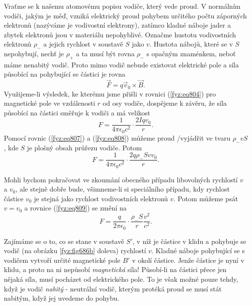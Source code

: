     Vraťme se k našemu atomovému popisu vodiče, který vede proud. V normálním vodiči, jakým je měď,
    vzniká elektrický proud pohybem určitého počtu záporných elektronů (nazýváme je vodivostní
    elektrony), zatímco kladné náboje jader a zbytek elektronů jsou v materiálu nepohyblivé. Označme
    hustotu vodivostních elektronů \( ρ_−\) a jejich rychlost v soustavě \(S\) jako \(v\). Hustota
    nábojů, které se v \(S\) nepohybují, nechť je \( ρ_+\) a ta musí být rovna \( ρ_−\) s opačným
    znaménkem, neboť  máme nenabitý vodič. Proto mimo vodič nebude existovat elektrické pole a síla
    působící na pohybující se částici je rovna
    \begin{equation*}
      \vec{F}=q\vec{v}_0\times\vec{B}.
    \end{equation*}
    Využijeme-li výsledek, ke kterému jsme přišli v rovnici (\ref{fyz:eq804}) pro magnetické pole ve
    vzdálenosti \(r\) od osy vodiče, dospějeme k závěru, že síla působící na částici směřuje k
    vodiči a má velikost
    \begin{equation*}
      F=\dfrac{1}{4πϵ_0c^2}\cdot\dfrac{2Iqv_0}{r}.
    \end{equation*}
    Pomocí rovnic (\ref{fyz:eq807}) a (\ref{fyz:eq808}) můžeme proud /vyjádřit ve tvaru
    \(ρ_−vS\), kde \(S\) je plošný obsah průřezu vodiče. Potom
    \begin{equation}\label{fyz:eq809}
      F=\dfrac{1}{4πϵ_0c^2}\cdot\dfrac{2qρ_−Svv_0}{r}.
    \end{equation}

    Mohli bychom pokračovat ve zkoumání obecného případu libovolných rychlostí \(v\) a \(v_0\), ale
    stejně dobře bude, všimneme-li si speciálního případu, kdy rychlost částice \(v_0\) je stejná
    jako rychlost vodivostních elektronů \(v\). Potom můžeme psát \(v=v_0\) a rovnice
    (\ref{fyz:eq809}) se změní na
    \begin{equation}\label{fyz:eq810}
      F=\dfrac{q}{2πϵ_0}\cdot\dfrac{ρ_−S}{r}\dfrac{v^2}{c^2}.
    \end{equation}

    Zajímáme se o to, co se stane v soustavě \(S'\), v níž je částice v klidu a pohybuje se vodič
    (na  obrázku \ref{fyz:fig686b} doleva) rychlostí \(v\). Kladné náboje pohybující se s vodičem
    vytvoří určité magnetické pole  \(B'\) v okolí částice. Jenže částice je nyní v klidu, a proto
    na ni nepůsobí \emph{magnetická} síla! Působí-li na částici přece jen nějaká síla, musí pocházet
    od elektrického pole. To je však možné pouze tehdy, když je vodič \emph{nabitý} - neutrální
    vodič, kterým protéká proud se musí stát nabitým, když jej uvedeme do pohybu.

